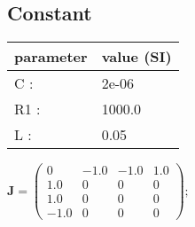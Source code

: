 \documentclass[11pt, oneside]{article}      %
\begin{document}
\subsection{Constant}
%
\begin{center}
%
\begin{tabular}{ll}
%
\hline
parameter & value (SI)
\\ \hline
C :& 2e-06
\\
R1 :& 1000.0
\\
L :& 0.05
\\
\hline
\end{tabular}
%
\end{center}
%
$ \mathbf{J} = \left(\begin{array}{cccc}0 & -1.0 & -1.0 & 1.0\\1.0 & 0 & 0 & 0\\1.0 & 0 & 0 & 0\\-1.0 & 0 & 0 & 0\end{array}\right) ; $ 
%
\\
%
\end{document}
